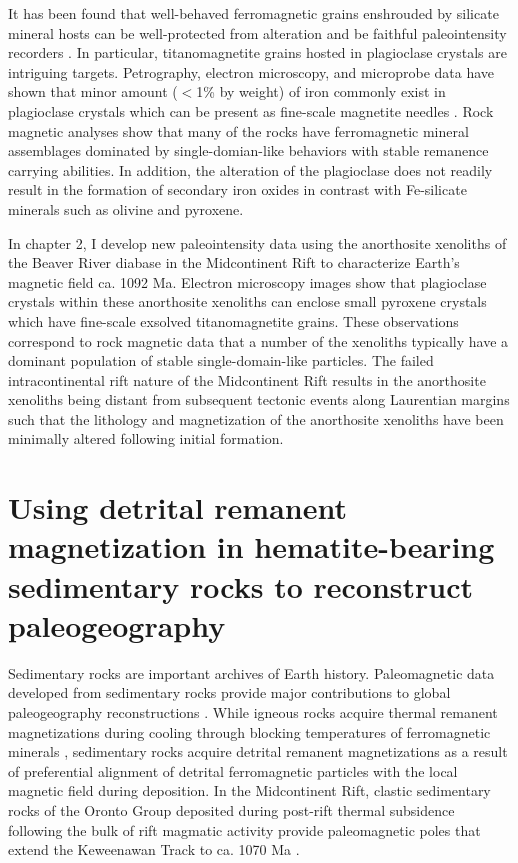 It has been found that well-behaved ferromagnetic grains enshrouded by silicate mineral hosts can be well-protected from alteration and be faithful paleointensity recorders \citep{Cottrell1999a, Cottrell2000a, Tarduno2005a, Tarduno2006a, Cottrell2008a, Selkin2000a, Selkin2007a, Selkin2008a}. In particular, titanomagnetite grains hosted in plagioclase crystals are intriguing targets. Petrography, electron microscopy, and microprobe data have shown that minor amount ($<$1\% by weight) of iron commonly exist in plagioclase crystals which can be present as fine-scale magnetite needles \citep{Selkin2000a, Feinberg2005a, Feinberg2006a, Wenk2011a, Bian2021a}. Rock magnetic analyses show that many of the rocks have ferromagnetic mineral assemblages dominated by single-domian-like behaviors with stable remanence carrying abilities. In addition, the alteration of the plagioclase does not readily result in the formation of secondary iron oxides in contrast with Fe-silicate minerals such as olivine and pyroxene. 

In chapter 2, I develop new paleointensity data using the anorthosite xenoliths of the Beaver River diabase in the Midcontinent Rift to characterize Earth's magnetic field ca. 1092 Ma. Electron microscopy images show that plagioclase crystals within these anorthosite xenoliths can enclose small pyroxene crystals which have fine-scale exsolved titanomagnetite grains. These observations correspond to rock magnetic data that a number of the xenoliths typically have a dominant population of stable single-domain-like particles. The failed intracontinental rift nature of the Midcontinent Rift results in the anorthosite xenoliths being distant from subsequent tectonic events along Laurentian margins such that the lithology and magnetization of the anorthosite xenoliths have been minimally altered following initial formation. 

\section{Using detrital remanent magnetization in hematite-bearing sedimentary rocks to reconstruct paleogeography}

Sedimentary rocks are important archives of Earth history. Paleomagnetic data developed from sedimentary rocks provide major contributions to global paleogeography reconstructions \cite[e.g.][]{Torsvik2012a, Domeier2012a, Vaes2023a}. While igneous rocks acquire thermal remanent magnetizations during cooling through blocking temperatures of ferromagnetic minerals \citep{Neel1955a}, sedimentary rocks acquire detrital remanent magnetizations as a result of preferential alignment of detrital ferromagnetic particles with the local magnetic field during deposition. In the Midcontinent Rift, clastic sedimentary rocks of the Oronto Group deposited during post-rift thermal subsidence following the bulk of rift magmatic activity provide paleomagnetic poles that extend the Keweenawan Track to ca. 1070 Ma \citep{Henry1977a, Slotznick2023a}. 

